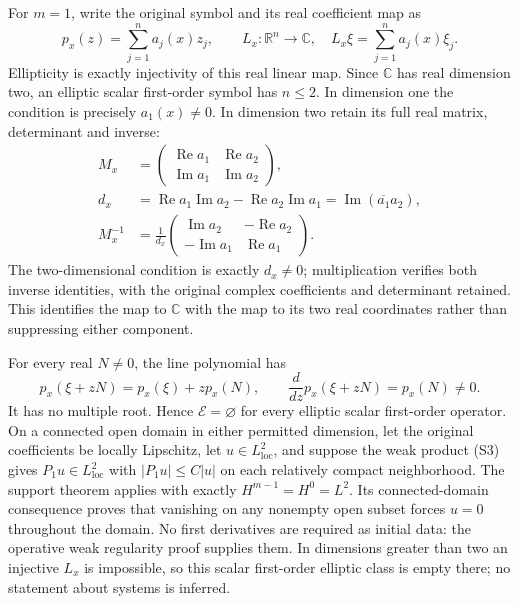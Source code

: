 \documentclass[
  11pt,
]{article}
\begin{document}
For \(m=1\), write the original symbol and its real coefficient map as
\[
 p_x(z)=\sum_{j=1}^n a_j(x)z_j,\qquad
 L_x:\mathbb R^n\longrightarrow\mathbb C,\quad
 L_x\xi=\sum_{j=1}^n a_j(x)\xi_j.                    \tag{S53}
\] Ellipticity is exactly injectivity of this real linear map. Since
\(\mathbb C\) has real dimension two, an elliptic scalar first-order
symbol has \(n\leq2\). In dimension one the condition is precisely
\(a_1(x)\ne0\). In dimension two retain its full real matrix,
determinant and inverse: \[
 \begin{split}
 M_x&=\begin{pmatrix}\operatorname{Re}a_1&\operatorname{Re}a_2\\
                     \operatorname{Im}a_1&\operatorname{Im}a_2\end{pmatrix},\\
 d_x&=\operatorname{Re}a_1\operatorname{Im}a_2
       -\operatorname{Re}a_2\operatorname{Im}a_1
       =\operatorname{Im}(\overline{a_1}a_2),\\
 M_x^{-1}&=\frac1{d_x}
          \begin{pmatrix}\operatorname{Im}a_2&-\operatorname{Re}a_2\\
                         -\operatorname{Im}a_1&\operatorname{Re}a_1\end{pmatrix}.
 \end{split}                                                    \tag{S54}
\] The two-dimensional condition is exactly \(d_x\ne0\); multiplication
verifies both inverse identities, with the original complex coefficients
and determinant retained. This identifies the map to \(\mathbb C\) with
the map to its two real coordinates rather than suppressing either
component.

For every real \(N\ne0\), the line polynomial has \[
 p_x(\xi+zN)=p_x(\xi)+zp_x(N),\qquad
 \frac{d}{dz}p_x(\xi+zN)=p_x(N)\ne0.                \tag{S55}
\] It has no multiple root. Hence \(\mathcal E=\varnothing\) for every
elliptic scalar first-order operator. On a connected open domain in
either permitted dimension, let the original coefficients be locally
Lipschitz, let \(u\in L^2_{\mathrm{loc}}\), and suppose the weak product
(S3) gives \(P_1u\in L^2_{\mathrm{loc}}\) with \(|P_1u|\leq C|u|\) on
each relatively compact neighborhood. The support theorem applies with
exactly \(H^{m-1}=H^0=L^2\). Its connected-domain consequence proves
that vanishing on any nonempty open subset forces \(u=0\) throughout the
domain. No first derivatives are required as initial data: the operative
weak regularity proof supplies them. In dimensions greater than two an
injective \(L_x\) is impossible, so this scalar first-order elliptic
class is empty there; no statement about systems is inferred.
\end{document}
